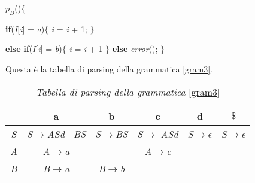 $p_B$()$\{$ \par \hspace{0.5cm}\textbf{if}(\textit{I}[\textit{i}] = \textit{a})$\{$ \textit{i} = \textit{i} + 1; $\}$\par \hspace{0.5cm}\textbf{else} \textbf{if}(\textit{I}[\textit{i}] = \textit{b})$\{$ \textit{i} = \textit{i} + 1 $\}$ \textbf{else} \textit{error}(); $\}$\par
\vspace{0.3cm}
Questa è la tabella di parsing della grammatica \ref{gram3}.
\begin{table}[hbpb]
	\centering
	\label{tabellaparsingNLL1}
	\begin{tabular}{cccccc} 
		\toprule
		& a & b & c & d & $\$$ \\ 
		\midrule
		\textit{S} 	& \textit{S}$\to$\textit{ASd} $\mid$ \textit{BS} & \textit{S}$\to$\textit{BS}&\textit{S}$\to$ \textit{ASd}&\textit{S}$\to$$\epsilon$& \textit{S}$\to$$\epsilon$\\ 
		\textit{A} & \textit{A}$\to$\textit{a}&  & \textit{A}$\to$\textit{c}\\ 
		\textit{B} & \textit{B}$\to$\textit{a} & \textit{B}$\to$\textit{b}&   \\ 
		\bottomrule
	\end{tabular}
	\caption{\textit{Tabella di parsing della grammatica }\ref{gram3}}
\end{table} \par
